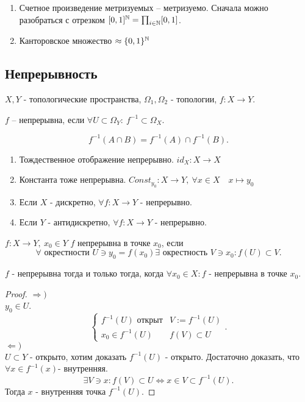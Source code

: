 \documentclass[12pt]{report}
\begin{document}
\begin{tasks}
    \begin{enumerate}
	\item Счетное произведение метризуемых -- метризуемо. Сначала можно разобраться с отрезком $[0, 1]^{\mathbb{N}} = \prod_{i \in  \mathbb{N}} [0, 1]$.
	\item Канторовское множество $\approx \{0, 1\}^{\mathbb{N}}$
    \end{enumerate}
\end{tasks}
\subsection{Непрерывность}
$X, Y$ - топологические пространства, $\Omega_1, \Omega_2$ -  топологии, $f: X \to  Y$.
\begin{defn}
    $f$ -- непрерывна, если $\forall U \subset \Omega _Y: ~ f^{-1} \subset \Omega_X$.
\end{defn}
\begin{note}
    \[
	f^{-1} (A \cap B) = f^{-1}(A) \cap f^{-1}(B)
    .\] 
\end{note}
\begin{exs}
    \begin{enumerate}
	\item Тождественное отображение непрерывно. $id_X : X \to  X$
	\item Константа тоже непрерывна. $Const_{y_0}:X \to Y, ~ \forall x \in  X \quad x\mapsto y_0 $
	\item Если $X$ - дискретно, $\forall f: X \to  Y$ - непрерывно.
	\item Если $Y$ - антидискретно, $\forall f: X \to  Y$ - непрерывно.
    \end{enumerate}
\end{exs}
\begin{defn}
    $f: X \to  Y, ~ x_0 \in Y$
    $f$ непрерывна в точке $ x_0$, если \[
	\forall \mbox{ окрестности } U \ni y_0 = f(x_0) \exists \mbox{ окрестность } V \ni x_0: f(U) \subset V
    .\] 
\end{defn}
\begin{thm}
    $f$ - непрерывна тогда и только тогда, когда $\forall x_0 \in  X: f$ - непрерывна в точке $x_0$.
\end{thm}
\begin{proof}
    $\Rightarrow )$\\
	$y_0 \in  U$.
	\[
	\left \{ 
	    \begin{array}{ll}
		f^{-1}(U) \mbox{ открыт} & V:=f^{-1}(U)\\
		x_0 \in f^{-1}(U) & f(V) \subset U
	        
	    \end{array}
	    \right .
	.\] 
	$\Leftarrow )$\\
	$U \subset Y$ - открыто, хотим доказать $f^{-1}(U)$ - открыто.
	Достаточно доказать, что $\forall x \in  f^{-1}(x) $- внутренняя.
	\[
	    \exists V \ni x: f(V)\subset U \Leftrightarrow x \in  V \subset f^{-1}(U)
	.\] 
	Тогда $x$ - внутренняя точка $f^{-1}(U)$.
\end{proof}
\end{document}
